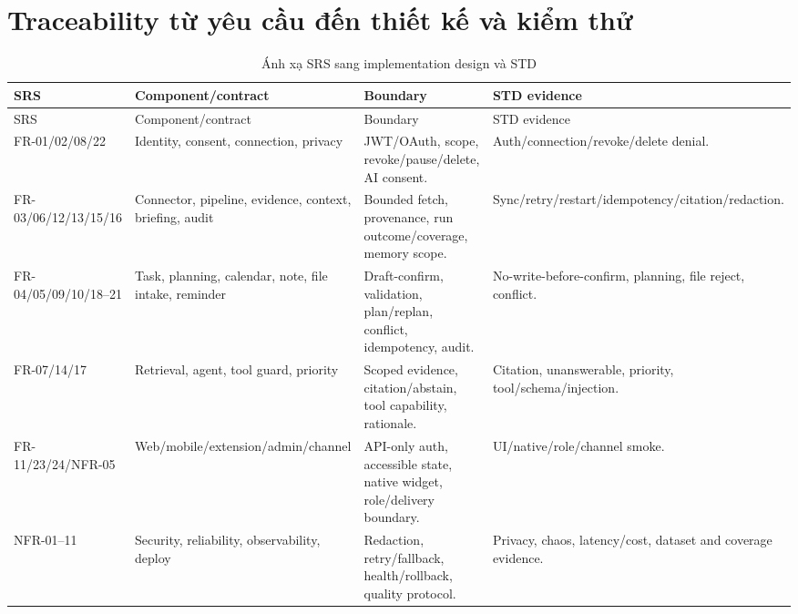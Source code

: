 \documentclass[12pt,a4paper]{article}
\begin{document}
\section{Traceability từ yêu cầu đến thiết kế và kiểm thử}
\label{sec:trace}
\begin{longtable}{p{2.5cm}p{4cm}p{4.3cm}p{3.2cm}}
\caption{Ánh xạ SRS sang implementation design và STD}\\
\toprule SRS & Component/contract & Boundary & STD evidence \\ \midrule
\endfirsthead
\toprule SRS & Component/contract & Boundary & STD evidence \\ \midrule
\endhead
FR-01/02/08/22 & Identity, consent, connection, privacy & JWT/OAuth, scope, revoke/pause/delete, AI consent. & Auth/connection/revoke/delete denial. \\
FR-03/06/12/13/15/16 & Connector, pipeline, evidence, context, briefing, audit & Bounded fetch, provenance, run outcome/coverage, memory scope. & Sync/retry/restart/idempotency/citation/redaction. \\
FR-04/05/09/10/18--21 & Task, planning, calendar, note, file intake, reminder & Draft-confirm, validation, plan/replan, conflict, idempotency, audit. & No-write-before-confirm, planning, file reject, conflict. \\
FR-07/14/17 & Retrieval, agent, tool guard, priority & Scoped evidence, citation/abstain, tool capability, rationale. & Citation, unanswerable, priority, tool/schema/injection. \\
FR-11/23/24/NFR-05 & Web/mobile/extension/admin/channel & API-only auth, accessible state, native widget, role/delivery boundary. & UI/native/role/channel smoke. \\
NFR-01--11 & Security, reliability, observability, deploy & Redaction, retry/fallback, health/rollback, quality protocol. & Privacy, chaos, latency/cost, dataset and coverage evidence. \\
\bottomrule
\end{longtable}
\end{document}
